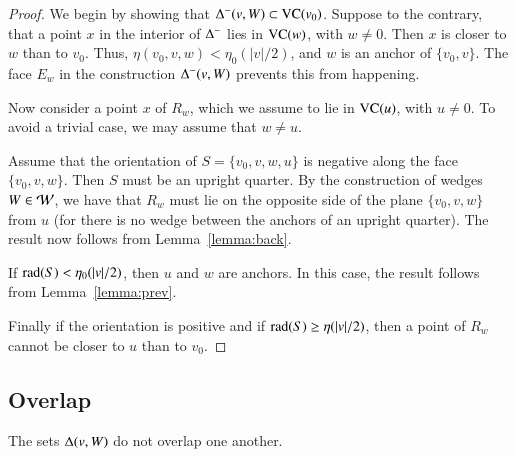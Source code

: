 \begin{proof}
We begin by showing that $\Delta^-(v,W)\subset{\operatorname{VC}}(v_0)$.
Suppose to the contrary, that a point $x$ in the interior of
$\Delta^-$ lies in ${\operatorname{VC}}(w)$, with $w\ne0$.  Then $x$ is closer
to $w$ than to  $v_0$.  Thus, $\eta(v_0,v,w)<\eta_0(|v|/2)$, and $w$
is an anchor of $\{v_0,v\}$.  The face $E_w$ in the construction
$\Delta^-(v,W)$ prevents this from happening.

Now consider a point $x$ of $R_w$, which we assume to lie in
${\operatorname{VC}}(u)$, with $u\ne0$.  To avoid a trivial case, we may
assume that $w\ne u$.

Assume that the orientation of $S=\{v_0,v,w,u\}$ is negative along
the face $\{v_0,v,w\}$.  Then $S$ must be an upright quarter.  By
the construction of wedges $W\in{\mathcal W}$, we have that $R_w$ must
lie on the opposite side of the plane $\{v_0,v,w\}$ from $u$ (for
there is no wedge between the anchors of an upright quarter).  The
result now follows from Lemma~\ref{lemma:back}.

If $\operatorname{rad}(S) <\eta_0(|v|/2)$, then $u$ and $w$ are anchors.  In
this case, the result follows from Lemma~\ref{lemma:prev}.

Finally if the orientation is positive and if $\operatorname{rad}(S)\ge
\eta(|v|/2)$, then a point of $R_w$ cannot be closer to $u$ than
to $v_0$.
\end{proof}


\subsection{Overlap}%
    \label{sec:overlap}


\begin{lemma}  The sets $\Delta(v,W)$ do not overlap one another.
\end{lemma}

